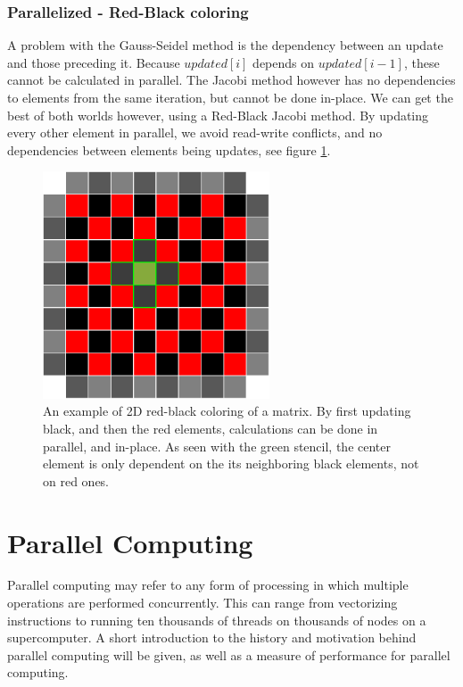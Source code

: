 \subsubsection*{Parallelized - Red-Black coloring}
\label{sec:red-black}
A problem with the Gauss-Seidel method is the dependency between an update and those preceding it. Because $updated[i]$
depends on $updated[i-1]$, these cannot be calculated in parallel. The Jacobi method however has no dependencies to elements
from the same iteration, but cannot be done in-place. We can get the best of both worlds however, using a Red-Black
Jacobi method. By updating every other element in parallel, we avoid read-write conflicts, and no dependencies between
elements being updates, see figure \ref{fig:red-black}.

\begin{figure}[!htbp]
	\centering
	\includegraphics[width=0.6\textwidth]{figure/sor-red-black}
	\caption[Red-black ordering]{An example of 2D red-black coloring of a matrix. By first updating black, and then the red elements,
	calculations can be done in parallel, and in-place. As seen with the green stencil, the center element is only dependent on the its neighboring black elements, not on red ones.}
	\label{fig:red-black}
\end{figure}

\section{Parallel Computing}
Parallel computing may refer to any form of processing in which multiple operations are performed concurrently. This can
range from vectorizing instructions to running ten thousands of threads on thousands of nodes on a supercomputer. A
short introduction to the history and motivation behind parallel computing will be given, as well as a measure of
performance for parallel computing.

